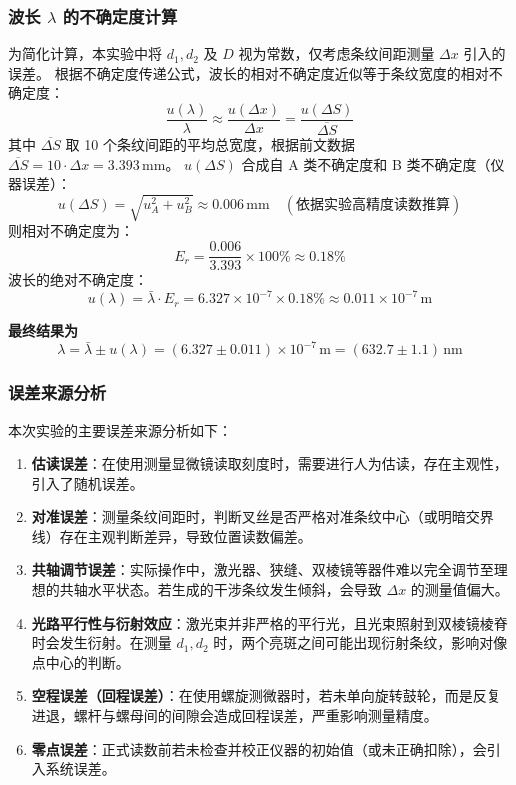 \documentclass[]{../template/Report}%
\begin{document}
\begin{fullreportonly}
\subsubsection{波长 $\lambda$ 的不确定度计算}
为简化计算，本实验中将 $d_1, d_2$ 及 $D$ 视为常数，仅考虑条纹间距测量 $\Delta x$ 引入的误差。
根据不确定度传递公式，波长的相对不确定度近似等于条纹宽度的相对不确定度：
\[
\frac{u(\lambda)}{\lambda} \approx \frac{u(\Delta x)}{\Delta x} = \frac{u(\Delta S)}{\overline{\Delta S}}
\]
其中 $\overline{\Delta S}$ 取 10 个条纹间距的平均总宽度，根据前文数据 $\overline{\Delta S} = 10 \cdot \Delta x = 3.393\,\text{mm}$。
$u(\Delta S)$ 合成自 A 类不确定度和 B 类不确定度（仪器误差）：
\[
u(\Delta S) = \sqrt{u_A^2 + u_B^2} \approx 0.006\,\text{mm} \quad (\text{依据实验高精度读数推算})
\]
则相对不确定度为：
\[
E_r = \frac{0.006}{3.393} \times 100\% \approx 0.18\%
\]
波长的绝对不确定度：
\[
u(\lambda) = \bar{\lambda} \cdot E_r = 6.327 \times 10^{-7} \times 0.18\% \approx 0.011 \times 10^{-7}\,\text{m}
\]

\textbf{最终结果为}
\[
\lambda = \bar{\lambda} \pm u(\lambda) = (6.327 \pm 0.011) \times 10^{-7}\,\text{m} = (632.7 \pm 1.1)\,\text{nm}
\]

\subsubsection{误差来源分析}
本次实验的主要误差来源分析如下：
\begin{enumerate}
    \item \textbf{估读误差}：在使用测量显微镜读取刻度时，需要进行人为估读，存在主观性，引入了随机误差。
    \item \textbf{对准误差}：测量条纹间距时，判断叉丝是否严格对准条纹中心（或明暗交界线）存在主观判断差异，导致位置读数偏差。
    \item \textbf{共轴调节误差}：实际操作中，激光器、狭缝、双棱镜等器件难以完全调节至理想的共轴水平状态。若生成的干涉条纹发生倾斜，会导致 $\Delta x$ 的测量值偏大。
    \item \textbf{光路平行性与衍射效应}：激光束并非严格的平行光，且光束照射到双棱镜棱脊时会发生衍射。在测量 $d_1, d_2$ 时，两个亮斑之间可能出现衍射条纹，影响对像点中心的判断。
    \item \textbf{空程误差（回程误差）}：在使用螺旋测微器时，若未单向旋转鼓轮，而是反复进退，螺杆与螺母间的间隙会造成回程误差，严重影响测量精度。
    \item \textbf{零点误差}：正式读数前若未检查并校正仪器的初始值（或未正确扣除），会引入系统误差。
\end{enumerate}



\end{fullreportonly}
\end{document}
